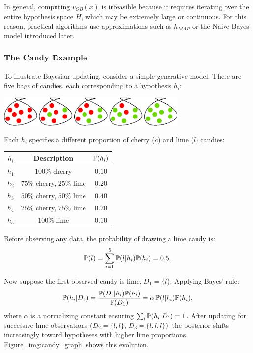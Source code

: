 \documentclass[10pt, letterpaper]{report}
\begin{document}
\bigskip
\noindent
In general, computing $v_{OB}(x)$ is infeasible because it requires iterating over the entire hypothesis space $H$, which may be extremely large or continuous.
For this reason, practical algorithms use approximations such as $h_{MAP}$ or the Naive Bayes model introduced later.

\bigskip
\subsubsection{The Candy Example}

To illustrate Bayesian updating, consider a simple generative model.
There are five bags of candies, each corresponding to a hypothesis $h_i$:
\begin{center}
	\includegraphics[width=0.7\textwidth]{images/candies.eps}
\end{center}

\noindent
Each $h_i$ specifies a different proportion of cherry ($c$) and lime ($l$) candies:
\begin{center}
	\begin{tabular}{c|c|c}
		$h_i$ & Description                & ${\mathbb P}(h_i)$ \\ \hline
		$h_1$ & $100\%$ cherry             & $0.10$       \\
		$h_2$ & $75\%$ cherry, $25\%$ lime & $0.20$       \\
		$h_3$ & $50\%$ cherry, $50\%$ lime & $0.40$       \\
		$h_4$ & $25\%$ cherry, $75\%$ lime & $0.20$       \\
		$h_5$ & $100\%$ lime               & $0.10$
	\end{tabular}
\end{center}

\noindent
Before observing any data, the probability of drawing a lime candy is:
\[
	{\mathbb P}(l) = \sum_{i=1}^{5}{\mathbb P}(l|h_i){\mathbb P}(h_i) = 0.5.
\]

\noindent
Now suppose the first observed candy is lime, $D_1=\{l\}$.
Applying Bayes’ rule:
\[
	{\mathbb P}(h_i|D_1) = \frac{{\mathbb P}(D_1|h_i){\mathbb P}(h_i)}{{\mathbb P}(D_1)} = \alpha \, {\mathbb P}(l|h_i){\mathbb P}(h_i),
\]
\newpage
where $\alpha$ is a normalizing constant ensuring $\sum_i {\mathbb P}(h_i|D_1)=1$.
After updating for successive lime observations ($D_2=\{l,l\}$, $D_3=\{l,l,l\}$), the posterior shifts increasingly toward hypotheses with higher lime proportions.
Figure~\ref{img:candy_graph} shows this evolution.
\end{document}
